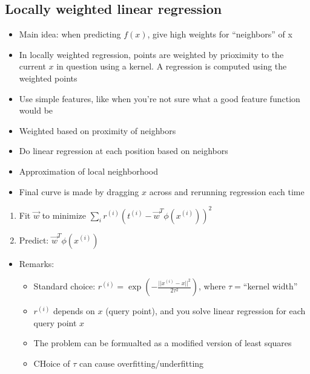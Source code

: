 \subsection{Locally weighted linear regression}
\begin{itemize}
	\item Main idea: when predicting $f(x)$, give high weights for ``neighbors'' of x
	\item In locally weighted regression, points are weighted by prioximity to the current $x$ in question using a kernel. A regression is computed using the weighted points
	\item Use simple features, like when you're not sure what a good feature function would be
	\item Weighted based on proximity of neighbors
	\item Do linear regression at each position based on neighbors
	\item Approximation of local neighborhood
	\item Final curve is made by dragging $x$ across and rerunning regression each time 
\end{itemize}

\begin{defn}
	\begin{enumerate}
		\item Fit $\vec{w}$ to minimize $\sum_i r^{(i)} \left( t^{(i)} - \vec{w}^T \phi (x^{(i)})\right)^2$
		\item Predict: $\vec{w}^T\phi(x^{(i)})$
	\end{enumerate}
	\begin{itemize}
		\item Remarks:
		\begin{itemize}
			\item Standard choice: $r^{(i)}=\exp\left( -\frac{||x^{(i)} - x||^2}{2\tau^2} \right)$, where $\tau=$``kernel width''
			\item $r^{(i)}$ depends on $x$ (query point), and you solve linear regression for each query point $x$
			\item The problem can be formualted as a modified version of least squares 
			\item CHoice of $\tau$ can cause overfitting/underfitting
		\end{itemize}
	\end{itemize}
\end{defn}